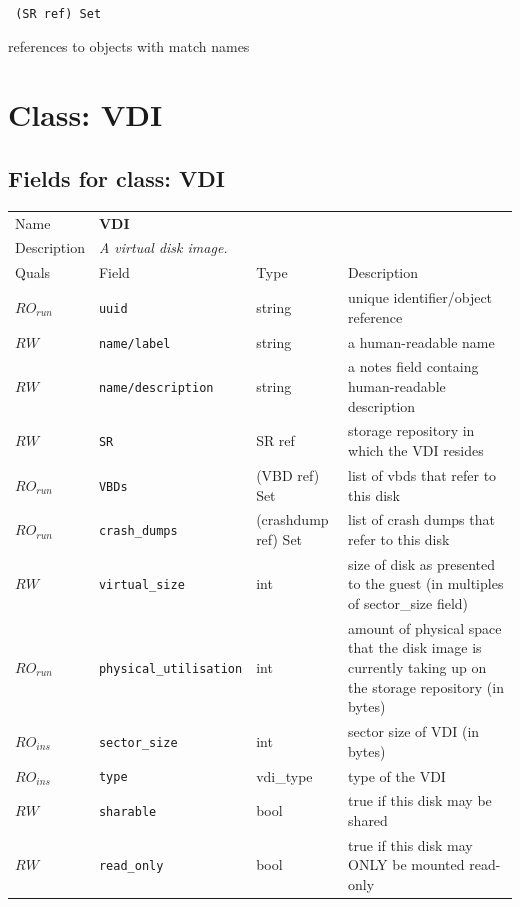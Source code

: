 \vspace{0.3cm}

{\tt 
(SR ref) Set
}


references to objects with match names
\vspace{0.3cm}
\vspace{0.3cm}
\vspace{0.3cm}

\vspace{1cm}
\newpage
\section{Class: VDI}
\subsection{Fields for class: VDI}
\begin{longtable}{|lllp{}|}
\hline
\multicolumn{1}{|l}{Name} & \multicolumn{3}{l|}{\bf VDI} \\
\multicolumn{1}{|l}{Description} & \multicolumn{3}{l|}{\parbox{11cm}{\em A
virtual disk image.}} \\
\hline
Quals & Field & Type & Description \\
\hline
$\mathit{RO}_\mathit{run}$ &  {\tt uuid} & string & unique identifier/object reference \\
$\mathit{RW}$ &  {\tt name/label} & string & a human-readable name \\
$\mathit{RW}$ &  {\tt name/description} & string & a notes field containg human-readable description \\
$\mathit{RW}$ &  {\tt SR} & SR ref & storage repository in which the VDI resides \\
$\mathit{RO}_\mathit{run}$ &  {\tt VBDs} & (VBD ref) Set & list of vbds that refer to this disk \\
$\mathit{RO}_\mathit{run}$ &  {\tt crash\_dumps} & (crashdump ref) Set & list of crash dumps that refer to this disk \\
$\mathit{RW}$ &  {\tt virtual\_size} & int & size of disk as presented to the guest (in multiples of sector\_size field) \\
$\mathit{RO}_\mathit{run}$ &  {\tt physical\_utilisation} & int & amount of physical space that the disk image is currently taking up on the storage repository (in bytes) \\
$\mathit{RO}_\mathit{ins}$ &  {\tt sector\_size} & int & sector size of VDI (in bytes) \\
$\mathit{RO}_\mathit{ins}$ &  {\tt type} & vdi\_type & type of the VDI \\
$\mathit{RW}$ &  {\tt sharable} & bool & true if this disk may be shared \\
$\mathit{RW}$ &  {\tt read\_only} & bool & true if this disk may ONLY be mounted read-only \\
\hline
\end{longtable}

